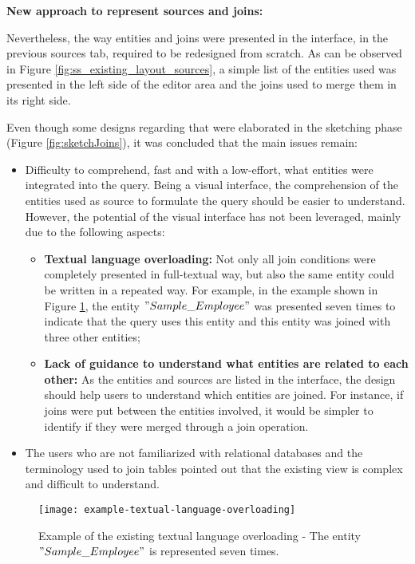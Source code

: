\medskip

\textbf{New approach to represent sources and joins:}

\medskip

Nevertheless, the way entities and joins were presented in the interface, in the previous sources tab, required to be redesigned from scratch. As can be observed in Figure \ref{fig:ss_existing_layout_sources}, a simple list of the entities used was presented in the left side of the editor area and the joins used to merge them in its right side.

Even though some designs regarding that were elaborated in the sketching phase (Figure \ref{fig:sketchJoins}), it was concluded that the main issues remain:

\begin{itemize}
  \item Difficulty to comprehend, fast and with a low-effort, what entities were integrated into the query. Being a visual interface, the comprehension of the entities used as source to formulate the query should be easier to understand. However, the potential of the visual interface has not been leveraged, mainly due to the following aspects:
  \begin{itemize} 
    \item \textbf{Textual language overloading: }Not only all join conditions were completely presented in full-textual way, but also the same entity could be written in a repeated way. For example, in the example shown in Figure \ref{fig:exampleTextualLanguageOverloading}, the entity $"Sample\_Employee"$ was presented seven times to indicate that the query uses this entity and this entity was joined with three other entities;
    \item \textbf{Lack of guidance to understand what entities are related to each other: }As the entities and sources are listed in the interface, the design should help users to understand which entities are joined. For instance, if joins were put between the entities involved, it would be simpler to identify if they were merged through a join operation.
  \end{itemize}
  \item The users who are not familiarized with relational databases and the terminology used to join tables pointed out that the existing view is complex and difficult to understand.
\end{itemize}

\begin{figure}[htbp]
	\centering
	\texttt{[image: example-textual-language-overloading]}
	\caption{Example of the existing textual language overloading - The entity $"Sample\_Employee"$ is represented seven times. }
	\label{fig:exampleTextualLanguageOverloading}
\end{figure}

